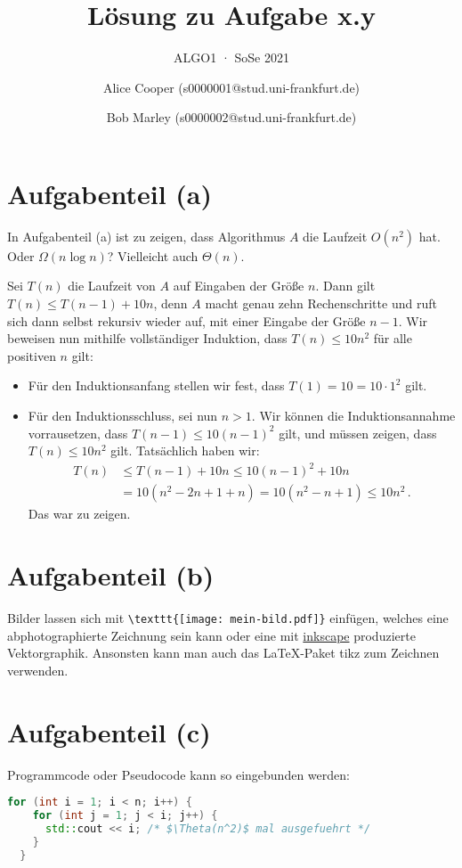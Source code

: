 \documentclass[a4paper,11pt,oneside]{scrartcl}
\subtitle{ALGO1 · SoSe 2021}
\title{Lösung zu Aufgabe x.y}
\author{%
  Alice Cooper (s0000001@stud.uni-frankfurt.de)%
  \and Bob Marley (s0000002@stud.uni-frankfurt.de)%
}
\begin{document}
\maketitle

\section{Aufgabenteil (a)}%

In Aufgabenteil (a) ist zu zeigen, dass Algorithmus $A$ die Laufzeit $O(n^2)$ hat. Oder $\Omega(n\log n)$? Vielleicht auch $\Theta(n)$.

Sei $T(n)$ die Laufzeit von $A$ auf Eingaben der Größe $n$.
Dann gilt $T(n)\le T(n-1) + 10n$, denn $A$ macht genau zehn Rechenschritte und ruft sich dann selbst rekursiv wieder auf, mit einer Eingabe der Größe $n-1$. Wir beweisen nun mithilfe vollständiger Induktion, dass $T(n)\le 10n^2$ für alle positiven $n$ gilt:

\begin{itemize}
  \item Für den Induktionsanfang stellen wir fest, dass $T(1)=10=10 \cdot 1^2$ gilt.
  \item Für den Induktionsschluss, sei nun $n>1$. Wir können die Induktionsannahme vorrausetzen, dass $T(n-1)\le 10 (n-1)^2$ gilt, und müssen zeigen, dass $T(n)\le 10n^2$ gilt. Tatsächlich haben wir:
  \begin{align*}
    T(n) &\le T(n-1)+10n
    \le 10(n-1)^2 + 10n\\
    &= 10 (n^2-2n+1+n)
    = 10 (n^2-n+1) \le 10 n^2\,.
  \end{align*}
  Das war zu zeigen.
\end{itemize}

\section{Aufgabenteil (b)}

Bilder lassen sich mit \verb|\texttt{[image: mein-bild.pdf]}| einfügen, welches eine abphotographierte Zeichnung sein kann oder eine mit \href{https://inkscape.org/}{inkscape} produzierte Vektorgraphik. Ansonsten kann man auch das LaTeX-Paket tikz zum Zeichnen verwenden.

\section{Aufgabenteil (c)}

Programmcode oder Pseudocode kann so eingebunden werden:
\begin{lstlisting}[language=C++]
  for (int i = 1; i < n; i++) {
    for (int j = 1; j < i; j++) {
      std::cout << i; /* $\Theta(n^2)$ mal ausgefuehrt */
    }
  }
\end{lstlisting}
\end{document}
